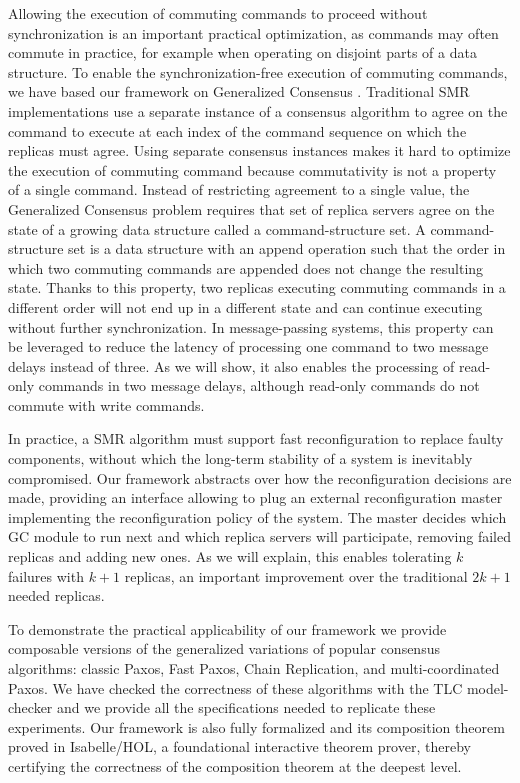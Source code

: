 Allowing the execution of commuting commands to proceed without
synchronization is an important practical optimization, as commands may
often commute in practice, for example when operating on disjoint parts
of a data structure. To enable the synchronization-free execution of
commuting commands, we have based our framework on Generalized Consensus
\cite{Lamport05GeneralizeConsensus}. Traditional SMR implementations use a
separate instance of a consensus algorithm to agree on the command to execute
at each index of the command sequence on which the replicas must agree. Using
separate consensus instances makes it hard to optimize the execution of
commuting command because commutativity is not a property of a single command.
Instead of restricting agreement to a single value, the Generalized Consensus
problem requires that set of replica servers agree on the state of a growing
data structure called a command-structure set. A command-structure set is
a data structure with an append operation such that the order in which two
commuting commands are appended does not change the resulting state. Thanks to
this property, two replicas executing commuting commands in a different order
will not end up in a different state and can continue executing without further
synchronization. In message-passing systems, this property can be leveraged to
reduce the latency of processing one command to two message delays instead of
three. As we will show, it also enables the processing of read-only commands
in two message delays, although read-only commands do not commute with write
commands.

In practice, a SMR algorithm must support fast reconfiguration to replace faulty
components, without which the long-term stability of a system is inevitably
compromised. Our framework abstracts over how the reconfiguration decisions
are made, providing an interface allowing to plug an external reconfiguration
master implementing the reconfiguration policy of the system. The master decides
which GC module to run next and which replica servers will participate, removing
failed replicas and adding new ones. As we will explain, this enables tolerating
$k$ failures with $k+1$ replicas, an important improvement over the traditional
$2k+1$ needed replicas.

To demonstrate the practical applicability of our framework we provide
composable versions of the generalized variations of popular consensus
algorithms: classic Paxos, Fast Paxos, Chain Replication, and multi-coordinated
Paxos. We have checked the correctness of these algorithms with the TLC
model-checker and we provide all the specifications needed to replicate these
experiments. Our framework is also fully formalized and its composition theorem
proved in Isabelle/HOL, a foundational interactive theorem prover, thereby
certifying the correctness of the composition theorem at the deepest level.

